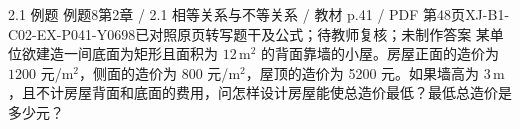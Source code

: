 \par\noindent\begin{minipage}{\linewidth}
\begin{bankitem}{2.1 例题 例题8}{第2章 / 2.1 相等关系与不等关系 / 教材 p.41 / PDF 第48页}{XJ-B1-C02-EX-P041-Y0698}{已对照原页转写题干及公式；待教师复核；未制作答案}
某单位欲建造一间底面为矩形且面积为 $12\,\mathrm{m^2}$ 的背面靠墙的小屋。房屋正面的造价为 $1200$ 元/$\mathrm{m^2}$，侧面的造价为 $800$ 元/$\mathrm{m^2}$，屋顶的造价为 5200 元。如果墙高为 $3\,\mathrm m$，且不计房屋背面和底面的费用，问怎样设计房屋能使总造价最低？最低总造价是多少元？
\end{bankitem}
\end{minipage}\par\medskip
